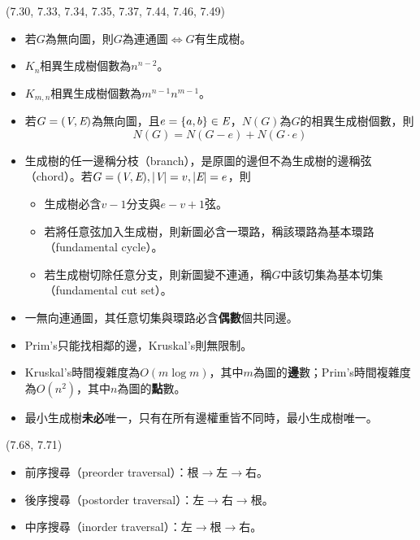 \item \begin{theorem}{(7.30, 7.33, 7.34, 7.35, 7.37, 7.44, 7.46, 7.49)} \quad\quad
    \begin{itemize}
        \item 若$G$為無向圖，則$G$為連通圖$\iff$$G$有生成樹。
        \item $K_n$相異生成樹個數為$n^{n - 2}$。
        \item $K_{m, n}$相異生成樹個數為$m^{n - 1}n^{m - 1}$。
        \item 若$G = (\textit{V}, \textit{E})$為無向圖，且$e = \{a, b\} \in \textit{E}$，$N(G)$為$G$的相異生成樹個數，則\begin{equation}
            N(G) = N(G - e) + N(G \cdot e)
        \end{equation}
        \item 生成樹的任一邊稱分枝（branch），是原圖的邊但不為生成樹的邊稱弦（chord）。若$G = (\textit{V}, \textit{E}), |\textit{V}| = v, |\textit{E}| = e$，則\begin{itemize}
            \item 生成樹必含$v - 1$分支與$e - v + 1$弦。
            \item 若將任意弦加入生成樹，則新圖必含一環路，稱該環路為基本環路（fundamental cycle）。
            \item 若生成樹切除任意分支，則新圖變不連通，稱$G$中該切集為基本切集（fundamental cut set）。
        \end{itemize}
        \item 一無向連通圖，其任意切集與環路必含\textbf{偶數}個共同邊。
        \item Prim's只能找相鄰的邊，Kruskal's則無限制。
        \item Kruskal's時間複雜度為$O(m\log m)$，其中$m$為圖的\textbf{邊}數；Prim's時間複雜度為$O(n^2)$，其中$n$為圖的\textbf{點}數。
        \item 最小生成樹\textbf{未必}唯一，只有在所有邊權重皆不同時，最小生成樹唯一。
    \end{itemize}
\end{theorem}

\item \begin{theorem}{(7.68, 7.71)} \quad\quad
    \begin{itemize}
        \item 前序搜尋（preorder traversal）：根$\rightarrow$左$\rightarrow$右。
        \item 後序搜尋（postorder traversal）：左$\rightarrow$右$\rightarrow$根。
        \item 中序搜尋（inorder traversal）：左$\rightarrow$根$\rightarrow$右。
    \end{itemize}
\end{theorem}
